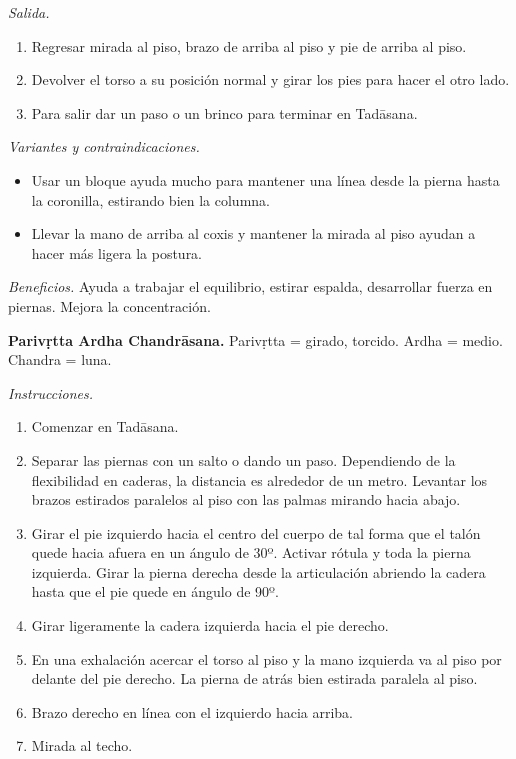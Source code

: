 \emph{Salida.}
\begin{enumerate}
\item Regresar mirada al piso, brazo de
arriba al piso y pie de arriba al piso.
\item Devolver el torso a su posición normal
y girar los pies para hacer el otro lado.
\item Para salir dar un paso o un brinco para
terminar en Tadāsana.
\end{enumerate}

\emph{Variantes y contraindicaciones.}
\begin{itemize}
\item Usar un bloque ayuda mucho para
mantener una línea desde la pierna hasta la
coronilla, estirando bien la columna.
\item Llevar la mano de arriba al coxis y
mantener la mirada al piso ayudan a hacer más
ligera la postura.
\end{itemize}

\emph{Beneficios.} Ayuda a trabajar el
equilibrio, estirar espalda, desarrollar
fuerza en piernas. Mejora la concentración.

\medskip\noindent\textbf{Parivṛtta Ardha
Chandrāsana.}
Parivṛtta = girado, torcido. Ardha = medio.
Chandra = luna.

\emph{Instrucciones.}
\begin{enumerate}
\item Comenzar en Tadāsana.
\item Separar las piernas con un salto o
dando un paso. Dependiendo de la flexibilidad
en caderas, la distancia es alrededor de un
metro. Levantar los brazos estirados
paralelos al piso con las palmas mirando
hacia abajo.
\item Girar el pie izquierdo hacia el centro
del cuerpo de tal forma que el talón quede
hacia afuera en un ángulo de 30º. Activar
rótula y toda la pierna izquierda. Girar la
pierna derecha desde la articulación abriendo
la cadera hasta que el pie quede en ángulo de
90º.
\item Girar ligeramente la
cadera izquierda hacia el pie derecho.
\item En una exhalación acercar el torso al
piso y la mano izquierda va al piso por
delante del pie derecho. La pierna de atrás
bien estirada paralela al piso.
\item Brazo derecho en línea con el izquierdo
hacia arriba.
\item Mirada al techo.
\end{enumerate}

